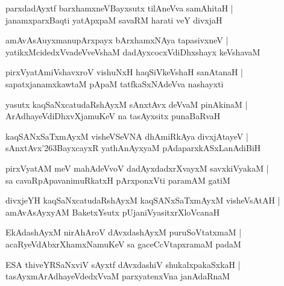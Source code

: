 \documentclass[twoside,12pt,openright]{book}
\def\S{\char'263}
\newcounter{shloka}[chapter]
\begin{document}
\begin{shloka}
parxdadAyxtf barxhamxneVBayxsutx tilAneVva samAhitaH |\\
janamxparxBaqti yatApxpaM savaRM harati veY divxjaH 
\end{shloka}

\begin{shloka}
amAvAsAuyxmanupArxpayx bArxhamxNAya tapasivxneV |\\
yatikxMcidedxVvadeVveVshaM dadAyxcocxVdiDhxshayx keVshavaM 
\end{shloka}

\begin{shloka}
pirxVyatAmiVshavxroV vishuNxH haqSiVkeVshaH sanAtanaH |\\
sapatxjanamxkawtaM pApaM tatfkaSxNAdeVva nashayxti 
\end{shloka}

\begin{shloka}
yasutx kaqSaNxcatudaRshAyxM sAnxtAvx deVvaM pinAkinaM |\\
ArAdhayeVdiDhxvXjamuKeV na tasAyxsitx punaBaRvaH 
\end{shloka}

\begin{shloka}
kaqSANxSaTxmAyxM visheVSeVNA dhAmiRkAya divxjAtayeV |\\
sAnxtAvx\S BayxcayxR yathAnAyxyaM  pAdaparxkASxLanAdiBiH
\end{shloka}

\begin{shloka}
pirxVyatAM meV mahAdeVvoV dadAyxdadxrXvayxM savxkiVyakaM |\\
sa cavaRpApavanimuRkatxH pArxponxVti paramAM gatiM 
\end{shloka}

\begin{shloka}
divxjeYH kaqSaNxcatudaRshAyxM kaqSANxSaTxmAyxM visheVsAtAH |\\
amAvAsAyxyAM BaketxYsutx pUjaniVyasitxrXloVcanaH 
\end{shloka}

\begin{shloka}
EkAdashAyxM nirAhAroV dAvxdashAyxM puruSoVtatxmaM |\\
acaRyeVdAbxrXhamxNamuKeV sa gaceCcVtapxramaM padaM 
\end{shloka}

\begin{shloka}
ESA thiveYRSaNxviV sAyxtf dAvxdashiV shukalxpakaSxkaH |\\
tasAyxmArAdhayeVdedxVvaM parxyatenxVna janAdaRnaM 
\end{shloka}
\end{document}
